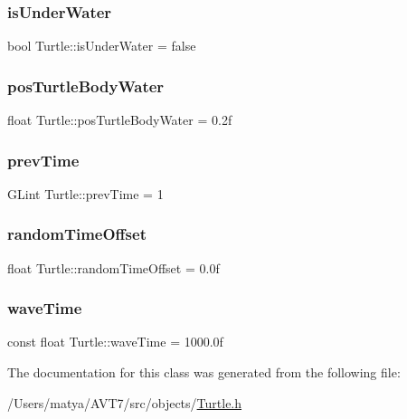 \subsubsection{\texorpdfstring{is\+Under\+Water}{isUnderWater}}
{\footnotesize\ttfamily bool Turtle\+::is\+Under\+Water = false}

\mbox{\label{class_turtle_a4e52ca74d8dff20d4e1aa16a1774dea4}} 
\subsubsection{\texorpdfstring{pos\+Turtle\+Body\+Water}{posTurtleBodyWater}}
{\footnotesize\ttfamily float Turtle\+::pos\+Turtle\+Body\+Water = 0.\+2f}

\mbox{\label{class_turtle_a786de5c643f4bb563bbf851da057a85b}} 
\subsubsection{\texorpdfstring{prev\+Time}{prevTime}}
{\footnotesize\ttfamily G\+Lint Turtle\+::prev\+Time = 1}

\mbox{\label{class_turtle_a827a4dc9095185fd3e7fd1a56e6e3587}} 
\subsubsection{\texorpdfstring{random\+Time\+Offset}{randomTimeOffset}}
{\footnotesize\ttfamily float Turtle\+::random\+Time\+Offset = 0.\+0f}

\mbox{\label{class_turtle_ab854ea2525dee2b36f2eba8f16573287}} 
\subsubsection{\texorpdfstring{wave\+Time}{waveTime}}
{\footnotesize\ttfamily const float Turtle\+::wave\+Time = 1000.\+0f}



The documentation for this class was generated from the following file\+:\begin{DoxyCompactItemize}
\item 
/\+Users/matya/\+A\+V\+T7/src/objects/\hyperlink{_turtle_8h}{Turtle.\+h}\end{DoxyCompactItemize}
